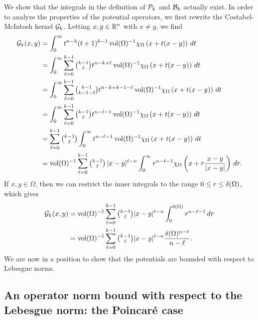 \documentclass[10pt,a4paper]{article}
\newcommand\cye[1]{%
\protect\leavevmode
\begingroup
    \color{blue}%
    #1%
\endgroup
}
\begin{document}
We show that the integrals in the definition of ${\mathcal P}_{k}$ and ${\mathcal B}_{k}$ actually exist. 
In order to analyze the properties of the potential operators,
we first rewrite the Costabel-McIntosh kernel ${\mathcal G}_{k}$.
Letting $x,y \in {\mathbb R}^n$ with $x \neq y$, we find 
\begin{align*}
    {\mathcal G}_{k}(x,y) 
    &= 
    \int_{0}^{\infty} t^{n-k} (t+1)^{k-1} \operatorname{vol}(\Omega)^{-1} \chi_{\Omega} \left( x+t(x-y) \right)\,dt
    \\
    &= 
    \int_{0}^{\infty} \sum_{\ell=0}^{k-1} \tbinom{k-1}{\ell} t^{n-k+\ell} \operatorname{vol}(\Omega)^{-1} \chi_{\Omega} \left( x+t(x-y) \right)\,dt
    \\
    &= 
    \int_{0}^{\infty} \sum_{\ell=0}^{k-1} \tbinom{k-1}{k-1-\ell} t^{n-k+k-1-\ell} \operatorname{vol}(\Omega)^{-1} \chi_{\Omega} \left( x+t(x-y) \right)\,dt
    \\
    &= 
    \int_{0}^{\infty} \sum_{\ell=0}^{k-1} \tbinom{k-1}{\ell} t^{n-\ell-1} \operatorname{vol}(\Omega)^{-1} \chi_{\Omega} \left( x+t(x-y) \right)\,dt
    \\
    &= 
    \sum_{\ell=0}^{k-1} \tbinom{k-1}{\ell} \int_{0}^{\infty} t^{n-\ell-1} \operatorname{vol}(\Omega)^{-1} \chi_{\Omega}\left( x+t(x-y) \right)\,dt 
    \\
    &= 
    \operatorname{vol}(\Omega)^{-1} \sum_{\ell=0}^{k-1} \tbinom{k-1}{\ell} \, |x-y|^{\ell-n} \int_{0}^{\infty} r^{n-\ell-1} \chi_{\Omega}\left(x+r\frac{x-y}{|x-y|}\right)\,dr
    .
\end{align*}
If $x, y \in \Omega$, then we can restrict the inner integrals to the range $0 \leq r \leq {\delta}(\Omega)$, which gives 
\begin{align*}
    {\mathcal G}_{k}(x,y) 
    &= 
    \operatorname{vol}(\Omega)^{-1} \sum_{\ell=0}^{k-1}\tbinom{k-1}{\ell} |x-y|^{\ell-n} \int_{0}^{{\delta}(\Omega)} r^{n-\ell-1} \,dr 
    \\
    &= 
    \operatorname{vol}(\Omega)^{-1} \sum_{\ell=0}^{k-1}\tbinom{k-1}{\ell} |x-y|^{\ell-n} \frac{ {\delta}(\Omega)^{n-\ell} }{n-\ell}.
\end{align*}
We are now in a position to show that the potentials are bounded with respect to Lebesgue norms. 

\subsection{\cye{An operator norm bound with respect to the Lebesgue norm: the Poincar\'e case}}
\end{document}
